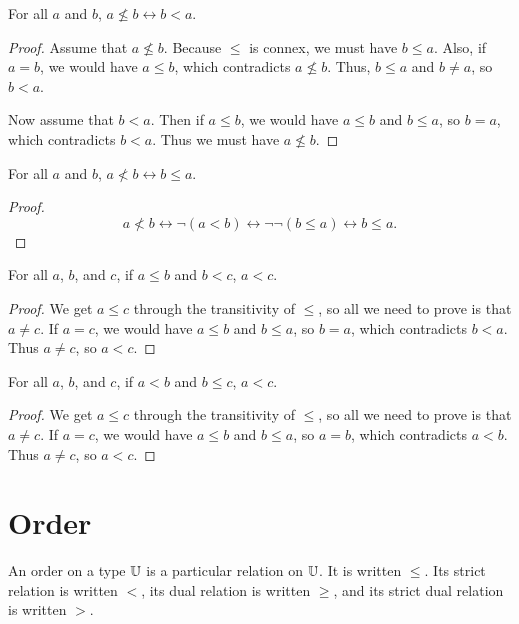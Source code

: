\documentclass[../math.tex]{subfiles}
\begin{document}
\begin{theorem}
    For all $a$ and $b$, $a \nleq b \leftrightarrow b < a$.
\end{theorem}
\begin{proof}
    Assume that $a \nleq b$.  Because $\leq$ is connex, we must have $b \leq a$.
    Also, if $a = b$, we would have $a \leq b$, which contradicts $a \nleq b$.
    Thus, $b \leq a$ and $b \neq a$, so $b < a$.

    Now assume that $b < a$.  Then if $a \leq b$, we would have $a \leq b$ and
    $b \leq a$, so $b = a$, which contradicts $b < a$.  Thus we must have $a
    \nleq b$.
\end{proof}

\begin{theorem}
    For all $a$ and $b$, $a \nless b \leftrightarrow b \leq a$.
\end{theorem}
\begin{proof}
    \[
        a \nless b \leftrightarrow \neg (a < b) \leftrightarrow \neg\neg (b \leq
        a) \leftrightarrow b \leq a.
    \]
\end{proof}

\begin{theorem}
    For all $a$, $b$, and $c$, if $a \leq b$ and $b < c$, $a < c$.
\end{theorem}
\begin{proof}
    We get $a \leq c$ through the transitivity of $\leq$, so all we need to
    prove is that $a \neq c$.  If $a = c$, we would have $a \leq b$ and $b \leq
    a$, so $b = a$, which contradicts $b < a$.  Thus $a \neq c$, so $a < c$.
\end{proof}

\begin{theorem}
    For all $a$, $b$, and $c$, if $a < b$ and $b \leq c$, $a < c$.
\end{theorem}
\begin{proof}
    We get $a \leq c$ through the transitivity of $\leq$, so all we need to
    prove is that $a \neq c$.  If $a = c$, we would have $a \leq b$ and $b \leq
    a$, so $a = b$, which contradicts $a < b$.  Thus $a \neq c$, so $a < c$.
\end{proof}

\section{Order}

\begin{class}
    An order on a type $\mathbb{U}$ is a particular relation on $\mathbb{U}$.  It is written
    $\leq$.  Its strict relation is written $<$, its dual relation is written
    $\geq$, and its strict dual relation is written $>$.
\end{class}
\end{document}
